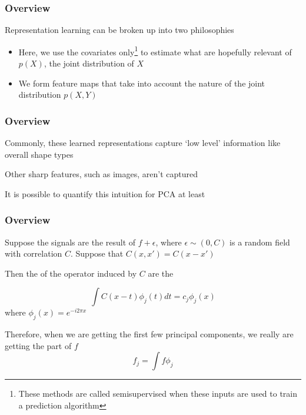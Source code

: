 \documentclass[12pt]{beamer}
\begin{document}
\begin{frame}[fragile]
\frametitle{Overview}
Representation learning can be broken up into two philosophies 

\begin{itemize}
\item {} Here, we use the covariates only\footnote{These methods are called
semisupervised when these inputs are used to train a prediction algorithm} to estimate what are hopefully relevant  of $p(X)$, the joint distribution of $X$

\item {}  We form feature maps that take into account the nature of the joint distribution
$p(X,Y)$

\end{itemize}
\end{frame}


\begin{frame}[fragile]
\frametitle{Overview}
Commonly, these learned representations capture `low level' information like overall shape types

\vsp
Other sharp features, such as images, aren't captured

\vsp
It is possible to quantify this intuition for PCA at least

\end{frame}

\begin{frame}[fragile]
\frametitle{Overview}

Suppose the signals are the result of $f + \epsilon$, where $\epsilon \sim (0,C)$ is a random field
with correlation $C$.  Suppose that $C(x,x') = C(x-x')$


\vsp
Then the  of the operator induced by $C$ are the 

\[
\int C(x-t) \phi_j(t)dt = c_j \phi_j(x)
\]
where $\phi_j(x) = e^{-i2\pi x}$

\vsp
Therefore, when we are getting the first few principal components, we really are getting the 
part of $f$
\[
f_j = \int f \phi_j
\]
\end{frame}
\end{document}
